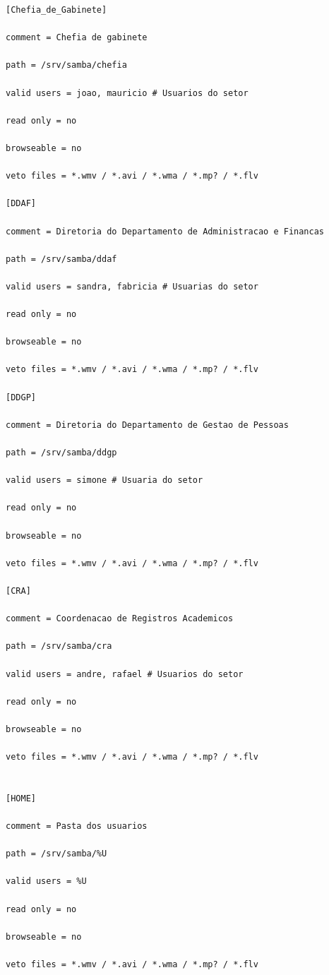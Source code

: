 \begin{lstlisting}[caption=Arquivo /etc/smb.conf com as variáveis aplicadas no estudo de caso.,label={smb_conf_estudo}]
[Chefia_de_Gabinete]

comment = Chefia de gabinete

path = /srv/samba/chefia

valid users = joao, mauricio # Usuarios do setor

read only = no

browseable = no

veto files = *.wmv / *.avi / *.wma / *.mp? / *.flv

[DDAF] 

comment = Diretoria do Departamento de Administracao e Financas

path = /srv/samba/ddaf

valid users = sandra, fabricia # Usuarias do setor

read only = no

browseable = no

veto files = *.wmv / *.avi / *.wma / *.mp? / *.flv

[DDGP] 

comment = Diretoria do Departamento de Gestao de Pessoas

path = /srv/samba/ddgp

valid users = simone # Usuaria do setor

read only = no

browseable = no

veto files = *.wmv / *.avi / *.wma / *.mp? / *.flv

[CRA] 

comment = Coordenacao de Registros Academicos

path = /srv/samba/cra

valid users = andre, rafael # Usuarios do setor

read only = no

browseable = no

veto files = *.wmv / *.avi / *.wma / *.mp? / *.flv


[HOME] 

comment = Pasta dos usuarios

path = /srv/samba/%U

valid users = %U

read only = no

browseable = no

veto files = *.wmv / *.avi / *.wma / *.mp? / *.flv
\end{lstlisting}

